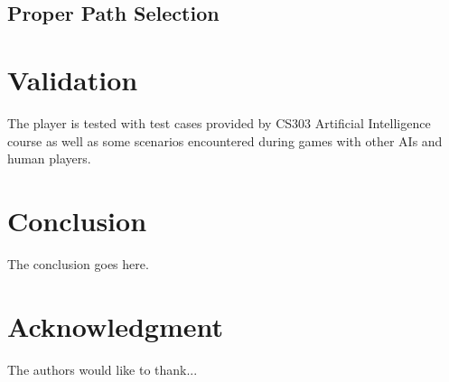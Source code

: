 \documentclass[conference]{IEEEtran}
\begin{document}
\subsection{Proper Path Selection}

\section{Validation}
	The player is tested with test cases provided by CS303 Artificial Intelligence course as well as some scenarios encountered during games with other AIs and human players. 

  \section{Conclusion}
  The conclusion goes here.

  \section*{Acknowledgment}

  The authors would like to thank...
  
  
  
  
  
  
\end{document}
